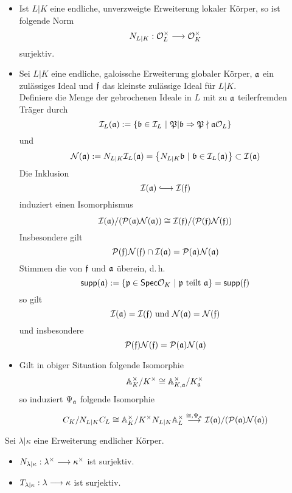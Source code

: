 \Satz{}
\begin{itemize}
\item Ist $L|K$ eine endliche, unverzweigte Erweiterung lokaler Körper, so ist folgende Norm
\[ N_{L|K} : \mathcal{O}_L^\times \overset{}{\longrightarrow} \mathcal{O}_K^\times \]
surjektiv.
\item Sei $L|K$ eine endliche, galoissche Erweiterung globaler Körper, $\mathfrak{a}$ ein zulässiges Ideal und $\mathfrak{f}$ das kleinste zulässige Ideal für $L|K$.\\
Definiere die Menge der gebrochenen Ideale in $L$ mit zu $\mathfrak{a}$ teilerfremden Träger durch
\[ \I_L(\af) := \set{\bf \in \I_L}{ \Pf | \bf \impl{} \Pf \nmid \af\O_L } \]
und
\[ \Nc(\af) := N_{L|K}\I_L(\af) = \set{N_{L|K}\bf}{\bf \in \I_L(\af)} \subset \I(\af) \]
Die Inklusion
\[ \I(\af) \Inj{} \I(\ff) \]
induziert einen Isomorphismus
\[ \mathcal{I}(\mathfrak{a}) / (\mathcal{P}(\mathfrak{a}) \mathcal{N}(\mathfrak{a})) \overset{}{\cong} \mathcal{I}(\mathfrak{f}) / (\mathcal{P}(\mathfrak{f}) \mathcal{N}(\mathfrak{f})) \]
Insbesondere gilt
\[ \mathcal{P}(\mathfrak{f}) \mathcal{N}(\mathfrak{f}) \cap \mathcal{I}(\mathfrak{a}) = \mathcal{P}(\mathfrak{a})\mathcal{N}(\mathfrak{a}) \]
Stimmen die  von $\mathfrak{f}$ und $\mathfrak{a}$ überein, d.\,h.
\[ \textsf{supp}(\af) := \set{\pf \in \textsf{Spec}\O_K }{ \pf \text{ teilt } \af } = \textsf{supp}(\ff)  \]
so gilt
\[ \mathcal{I}(\mathfrak{a}) = \mathcal{I}(\mathfrak{f}) \text{ und } \mathcal{N}(\mathfrak{a}) = \mathcal{N}(\mathfrak{f}) \]
und insbesondere
\[ \mathcal{P}(\mathfrak{f}) \mathcal{N}(\mathfrak{f}) = \mathcal{P}(\mathfrak{a}) \mathcal{N}(\mathfrak{a}) \]
\item Gilt in obiger Situation folgende Isomorphie
\[ \mathbb{A}_K^\times/K^\times \overset{}{\cong} \mathbb{A}_{K,\mathfrak{a}}^\times/K_{\mathfrak{a}}^\times \]
so induziert $\Psi_{\mathfrak{a}}$ folgende Isomorphie
\[ C_K / N_{L|K}C_L \overset{}{\cong} \mathbb{A}_K^\times / K^\times N_{L|K}\mathbb{A}_L^\times \overset{\overset{}{\cong}, \Psi_{\mathfrak{a}}}{\longrightarrow} \mathcal{I}(\mathfrak{a}) / (\mathcal{P}(\mathfrak{a}) \mathcal{N} (\mathfrak{a})) \]
\end{itemize}

\Lem{}
Sei $\lambda | \kappa$ eine Erweiterung endlicher Körper.
\begin{itemize}
\item $N_{\lambda|\kappa} : \lambda^\times \overset{}{\longrightarrow} \kappa^\times$ ist surjektiv.
\item $T_{\lambda|\kappa} : \lambda \overset{}{\longrightarrow} \kappa$ ist surjektiv.
\end{itemize}